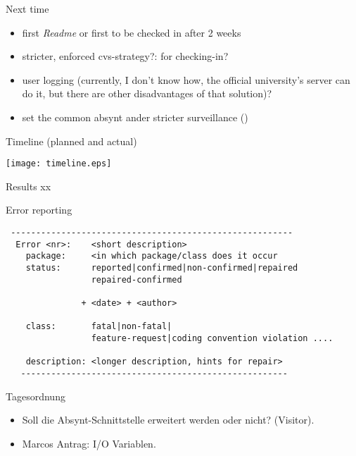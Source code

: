 \begin{myslide}{Next time}
  \begin{itemize}
  \item first \emph{Readme} or first 
     to be checked in after 2 weeks
  \item stricter, enforced cvs-strategy?:  for checking-in?
  \item user logging (currently, I don't know how, the official
    university's server can do it, but there are other disadvantages of
    that solution)?
  \item set the common absynt ander stricter surveillance
    ()
  \end{itemize}
\end{myslide}


\begin{myslide}{Timeline (planned and actual)}
  \begin{center}
    \texttt{[image: timeline.eps]}  
    \end{center}
\end{myslide}



\begin{myslide}{Results}
  xx
\end{myslide}


\begin{myslide}{Error reporting}
{\footnotesize 

\begin{verbatim}
 --------------------------------------------------------
  Error <nr>:    <short description>
    package:     <in which package/class does it occur
    status:      reported|confirmed|non-confirmed|repaired
                 repaired-confirmed

               + <date> + <author>
   
    class:       fatal|non-fatal|
                 feature-request|coding convention violation ....

    description: <longer description, hints for repair>
   -----------------------------------------------------

\end{verbatim}
}
\end{myslide}
\begin{myslide}{Tagesordnung}
  \begin{itemize}
  \item Soll die Absynt-Schnittstelle erweitert werden oder nicht?
    (Visitor).
  \item Marcos Antrag: I/O Variablen.
  \end{itemize}
  
\end{myslide}

